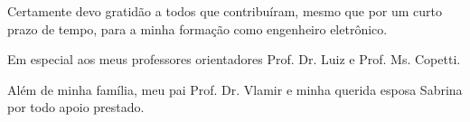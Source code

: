 
\begin{agradecimentos}%

Certamente devo gratidão a todos que contribuíram, mesmo que por um curto prazo de tempo, para a minha formação como engenheiro eletrônico.

Em especial aos meus professores orientadores Prof. Dr. Luiz e Prof. Ms. Copetti.

Além de minha família, meu pai Prof. Dr. Vlamir e minha querida esposa Sabrina por todo apoio prestado.

\end{agradecimentos}
